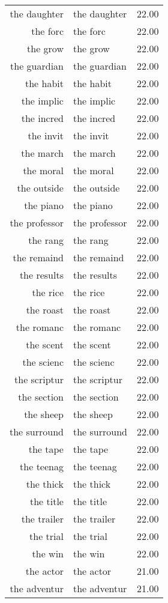 \begin{table}[ht]
\begin{tabular}{rlr}
  the daughter & the daughter & 22.00 \\ 
  the forc & the forc & 22.00 \\ 
  the grow & the grow & 22.00 \\ 
  the guardian & the guardian & 22.00 \\ 
  the habit & the habit & 22.00 \\ 
  the implic & the implic & 22.00 \\ 
  the incred & the incred & 22.00 \\ 
  the invit & the invit & 22.00 \\ 
  the march & the march & 22.00 \\ 
  the moral & the moral & 22.00 \\ 
  the outside & the outside & 22.00 \\ 
  the piano & the piano & 22.00 \\ 
  the professor & the professor & 22.00 \\ 
  the rang & the rang & 22.00 \\ 
  the remaind & the remaind & 22.00 \\ 
  the results & the results & 22.00 \\ 
  the rice & the rice & 22.00 \\ 
  the roast & the roast & 22.00 \\ 
  the romanc & the romanc & 22.00 \\ 
  the scent & the scent & 22.00 \\ 
  the scienc & the scienc & 22.00 \\ 
  the scriptur & the scriptur & 22.00 \\ 
  the section & the section & 22.00 \\ 
  the sheep & the sheep & 22.00 \\ 
  the surround & the surround & 22.00 \\ 
  the tape & the tape & 22.00 \\ 
  the teenag & the teenag & 22.00 \\ 
  the thick & the thick & 22.00 \\ 
  the title & the title & 22.00 \\ 
  the trailer & the trailer & 22.00 \\ 
  the trial & the trial & 22.00 \\ 
  the win & the win & 22.00 \\ 
  the actor & the actor & 21.00 \\ 
  the adventur & the adventur & 21.00 \\ 

\end{tabular}
\end{table}
